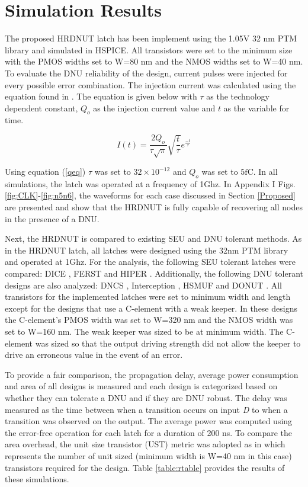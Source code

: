 \section{Simulation Results} \label{sec:res}
The proposed HRDNUT latch has been implement using the 1.05V 32 nm PTM library \cite{PTM} and simulated in HSPICE. All transistors were set to the minimum size with the PMOS widths set to W=80 nm and the NMOS widths set to W=40 nm. To evaluate the DNU reliability of the design, current pulses were injected for every possible error combination. The injection current was calculated using the equation found in \cite{injeq}. The equation is given below with $\tau$ as the technology dependent constant, $Q_o$ as the injection current value and $t$ as the variable for time. 

\begin{equation}\label{qeq}
I(t)=\frac{2Q_o}{\tau\sqrt{\pi}}\sqrt{\frac{t}{\tau}}e^{\frac{-t}{\tau}}
\end{equation}

Using equation (\ref{qeq}) $\tau$ was set to $32\times10^{-12}$ and $Q_o$ was set to $5\text{fC}$. In all simulations, the latch was operated at a frequency of 1Ghz. In Appendix I Figs. \ref{fig:CLK}-\ref{fig:n5n6}, the waveforms for each case discussed in Section \ref{Proposed} are presented and show that the HRDNUT is fully capable of recovering all nodes in the presence of a DNU. 

Next, the HRDNUT is compared to existing SEU and DNU tolerant methods. As in the HRDNUT latch, all latches were designed using the 32nm PTM library and operated at 1Ghz. For the analysis, the following SEU tolerant latches were compared: DICE \cite{DICE}, FERST \cite{FERST} and HIPER \cite{HIPER}. Additionally, the following DNU tolerant designs are also analyzed: DNCS \cite{DNCS}, Interception \cite{Inter}, HSMUF \cite{HSMUF} and DONUT \cite{DONUT}. All transistors for the implemented latches were set to minimum width and length except for the designs that use a C-element with a weak keeper. In these designs the C-element's PMOS width was set to W=320 nm and the NMOS width was set to W=160 nm. The weak keeper was sized to be at minimum width. The C-element was sized so that the output driving strength did not allow the keeper to drive an erroneous value in the event of an error. 

To provide a fair comparison, the propagation delay, average power consumption and area of all designs is measured and each design is categorized based on whether they can tolerate a DNU and if they are DNU robust. The delay was measured as the time between when a transition occurs on input \textit{D} to when a transition was observed on the output. The average power was computed using the error-free operation for each latch for a duration of 200 ns. To compare the area overhead, the unit size transistor (UST) metric was adopted as in \cite{DNCS} which represents the number of unit sized (minimum width is W=40 nm in this case) transistors required for the design. Table \ref{table:rtable} provides the results of these simulations.

